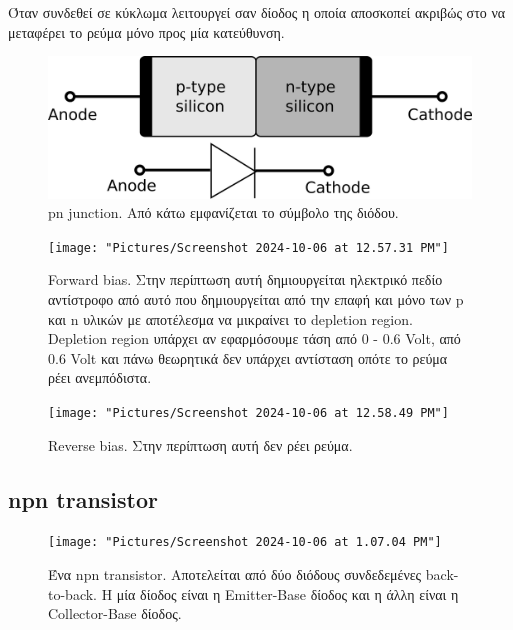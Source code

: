 \documentclass[11pt, oneside]{memoir}   	%
\begin{document}
Όταν συνδεθεί σε κύκλωμα λειτουργεί σαν δίοδος η οποία αποσκοπεί ακριβώς στο να μεταφέρει το ρεύμα μόνο προς μία κατεύθυνση.




\begin{center}
	
	\begin{figure}[H]
		\centering
		\includegraphics[width=0.7\linewidth]{Pictures/diode}
		\caption{pn junction. Από κάτω εμφανίζεται το σύμβολο της διόδου.}
		\label{fig:diode}
	\end{figure}
	
	\begin{figure}[H]
		\centering
		\texttt{[image: "Pictures/Screenshot 2024-10-06 at 12.57.31 PM"]}
		\caption{Forward bias. Στην περίπτωση αυτή δημιουργείται ηλεκτρικό πεδίο αντίστροφο από αυτό που δημιουργείται από την επαφή και μόνο των p και n υλικών με αποτέλεσμα να μικραίνει το depletion region. Depletion region υπάρχει αν εφαρμόσουμε τάση από 0 - 0.6 Volt, από 0.6 Volt και πάνω θεωρητικά δεν υπάρχει αντίσταση οπότε το ρεύμα ρέει ανεμπόδιστα.}
		\label{fig:screenshot-2024-10-06-at-12}
	\end{figure}
	
	\begin{figure}[H]
		\centering
		\texttt{[image: "Pictures/Screenshot 2024-10-06 at 12.58.49 PM"]}
		\caption{Reverse bias. Στην περίπτωση αυτή δεν ρέει ρεύμα.}
		\label{fig:screenshot-2024-10-06-at-12}
	\end{figure}
\end{center}


\subsection{npn transistor}
\begin{figure}[H]
	\centering
	\texttt{[image: "Pictures/Screenshot 2024-10-06 at 1.07.04 PM"]}
	\caption{Ένα npn transistor. Αποτελείται από δύο διόδους συνδεδεμένες back-to-back. Η μία δίοδος είναι η Emitter-Base δίοδος και η άλλη είναι η Collector-Base δίοδος.}
	\label{fig:screenshot-2024-10-06-at-1}
\end{figure}
\end{document}
